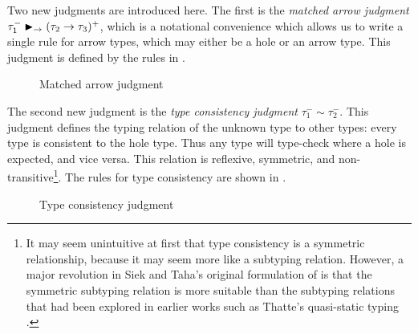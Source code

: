 Two new judgments are introduced here. The first is the \textit{matched arrow judgment} $\tau_1^- \blacktriangleright_{\rightarrow} (\tau_2\to\tau_3)^+$, which is a notational convenience which allows us to write a single rule for arrow types, which may either be a hole or an arrow type. This judgment is defined by the rules in .

\begin{figure}
  \centering
  \begin{mdframed}
    \begin{singlespace}
    \end{singlespace}
  \end{mdframed}
  \caption{Matched arrow judgment}
  \label{fig:matched-arrow}
\end{figure}

The second new judgment is the \textit{type consistency judgment} $\tau_1^-\sim\tau_2^-$. This judgment defines the typing relation of the unknown type to other types: every type is consistent to the hole type. Thus any type will type-check where a hole is expected, and vice versa. This relation is reflexive, symmetric, and non-transitive\footnote{It may seem unintuitive at first that type consistency is a symmetric relationship, because it may seem more like a subtyping relation. However, a major revolution in Siek and Taha's original formulation of \gtlc{} is that the symmetric subtyping relation is more suitable than the subtyping relations that had been explored in earlier works such as Thatte's quasi-static typing \cite{Siek06gradualtyping}.}. The rules for type consistency are shown in .

\begin{figure}
  \centering
  \begin{mdframed}
    \begin{singlespace}
    \end{singlespace}
  \end{mdframed}
  \caption{Type consistency judgment}
  \label{fig:type-consistency}
\end{figure}

